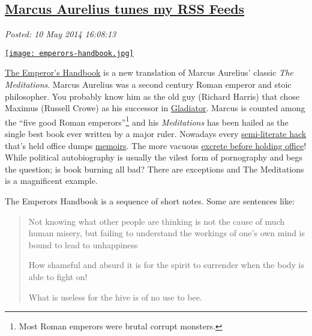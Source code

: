 %

\subsection*{\href{http://bakerjd99.wordpress.com/2014/05/10/marcus-aurelius-tunes-my-rss-feeds/}{Marcus Aurelius tunes my RSS Feeds}}


\noindent\emph{Posted: 10 May 2014 16:08:13}
\vspace{6pt}


\captionsetup[floatingfigure]{labelformat=empty}
\begin{floatingfigure}[l]{0.205\textwidth}
\centering
\href{http://www.barnesandnoble.com/w/emperors-handbook-marcus-aurelius/1115032739?ean=9780743233835}{\texttt{[image: emperors-handbook.jpg]}}
\label{fig:4682X0}
\end{floatingfigure} \href{http://www.amazon.com/The-Emperors-Handbook-Translation-Meditations/dp/0743233832}{The
Emperor's Handbook} is a new translation of Marcus Aurelius' classic
\emph{The Meditations}. Marcus Aurelius was a second century Roman
emperor and stoic philosopher. You probably know him as the old guy
(Richard Harris) that chose Maximus (Russell Crowe) as his successor in
\href{http://en.wikipedia.org/wiki/Gladiator_(2000_film)}{Gladiator}.
Marcus is counted among the ``five good Roman emperors''\footnote{
Most Roman emperors were brutal corrupt monsters.
} and his
\emph{Meditations} has been hailed as the single best book ever written
by a major ruler. Nowadays every
\href{http://www.amazon.com/Decision-Points-George-W-Bush/dp/0307590631}{semi-literate
hack} that's held office
dumps \href{http://en.wikipedia.org/wiki/My_Life_(Bill_Clinton_autobiography)}{memoirs}.
The more vacuous
\href{http://www.goodreads.com/book/show/88061.Dreams_from_My_Father}{excrete
before holding office}! While political autobiography is usually the
vilest form of pornography and begs the question; is book burning all
bad? There are exceptions and The Meditations is a magnificent example.

\medskip
The Emperors Handbook is a sequence of short notes. Some are sentences
like:

\begin{quote}
Not knowing what other people are thinking is not the cause of much
human misery, but failing to understand the workings of one's own mind
is bound to lead to unhappiness

How shameful and absurd it is for the spirit to surrender when the body
is able to fight on!

What is useless for the hive is of no use to bee.
\end{quote}

